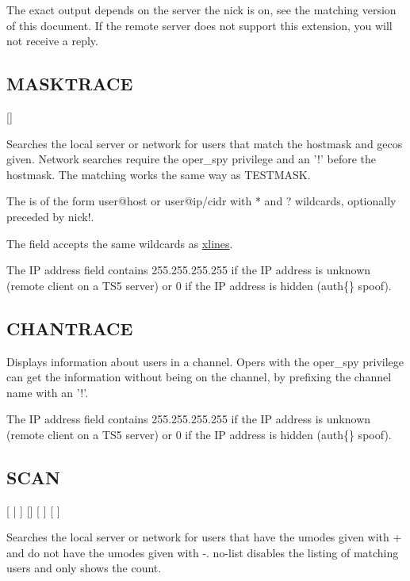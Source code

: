 	The exact output depends on the server the nick is on, see the matching
	version of this document. If the remote server does not support this
	extension, you will not receive a reply.


\subsection{MASKTRACE}

     []

	Searches the local server or network for users that match the hostmask
	and gecos given. Network searches require the oper\_spy privilege and
	an '!' before the hostmask. The matching works the same way as
	TESTMASK.

	The  is of the form user@host or user@ip/cidr with
	* and ? wildcards, optionally preceded by nick!.

	The  field accepts the same wildcards as
	\hyperref[XLINES]{xlines}.

	The IP address field contains 255.255.255.255 if the IP address is
	unknown (remote client on a TS5 server) or 0 if the IP address is
	hidden (auth\{\} spoof).


\subsection{CHANTRACE}


	Displays information about users in a channel. Opers with the
	oper\_spy privilege can get the information without being on the
	channel, by prefixing the channel name with an '!'.

	The IP address field contains 255.255.255.255 if the IP address is
	unknown (remote client on a TS5 server) or 0 if the IP address is
	hidden (auth\{\} spoof).


\subsection{SCAN}

    \literal{+}\literal{-}
    [ | ] []
    [ ]
    [ ]

	Searches the local server or network for users that have the umodes
	given with + and do not have the umodes given with -{}.	no-{}list
	disables the listing of matching users and only shows the count.

